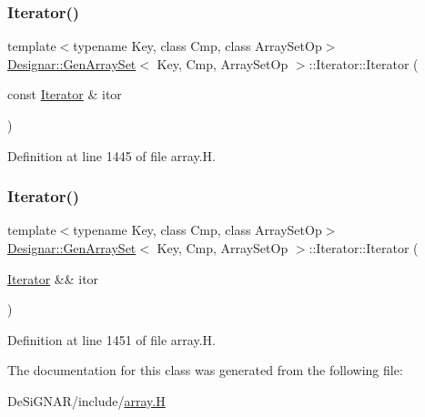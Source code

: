 \mbox{\label{class_designar_1_1_gen_array_set_1_1_iterator_a080025e4989fd5c3110e93e0c7c17fe2}} 
\subsubsection{\texorpdfstring{Iterator()}{Iterator()}\hspace{0.1cm}{\footnotesize\ttfamily [4/5]}}
{\footnotesize\ttfamily template$<$typename Key, class Cmp, class Array\+Set\+Op$>$ \\
\hyperlink{class_designar_1_1_gen_array_set}{Designar\+::\+Gen\+Array\+Set}$<$ Key, Cmp, Array\+Set\+Op $>$\+::Iterator\+::\+Iterator (\begin{DoxyParamCaption}\item[{const \hyperlink{class_designar_1_1_gen_array_set_1_1_iterator}{Iterator} \&}]{itor }\end{DoxyParamCaption})\hspace{0.3cm}{\ttfamily [inline]}}



Definition at line 1445 of file array.\+H.

\mbox{\label{class_designar_1_1_gen_array_set_1_1_iterator_aa82e1690f18b28782163e6bbb9d7d32a}} 
\subsubsection{\texorpdfstring{Iterator()}{Iterator()}\hspace{0.1cm}{\footnotesize\ttfamily [5/5]}}
{\footnotesize\ttfamily template$<$typename Key, class Cmp, class Array\+Set\+Op$>$ \\
\hyperlink{class_designar_1_1_gen_array_set}{Designar\+::\+Gen\+Array\+Set}$<$ Key, Cmp, Array\+Set\+Op $>$\+::Iterator\+::\+Iterator (\begin{DoxyParamCaption}\item[{\hyperlink{class_designar_1_1_gen_array_set_1_1_iterator}{Iterator} \&\&}]{itor }\end{DoxyParamCaption})\hspace{0.3cm}{\ttfamily [inline]}}



Definition at line 1451 of file array.\+H.



The documentation for this class was generated from the following file\+:\begin{DoxyCompactItemize}
\item 
De\+Si\+G\+N\+A\+R/include/\hyperlink{array_8_h}{array.\+H}\end{DoxyCompactItemize}
